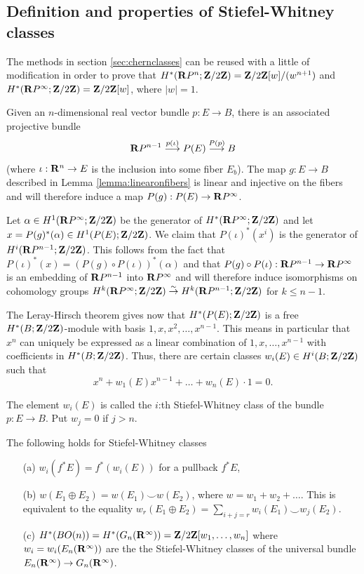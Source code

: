 \documentclass[a4paper,openany]{scrbook}
\begin{document}
\subsection{Definition and properties of Stiefel-Whitney classes}\label{subsec:dfnSWclasses}
The methods  in section \ref{sec:chernclasses} can be reused with a little of modification in order to prove that $H^*(\mathbf R P^n;\mathbf Z/2\mathbf Z)= \mathbf Z/2\mathbf Z[w]/(w^{n+1})$ and $H^*(\mathbf R P^\infty;\mathbf Z/2\mathbf Z)= \mathbf Z/2\mathbf Z[w]$, where $|w|=1$. 

Given an $n$-dimensional real vector bundle $p: E\to B$, there is an associated projective bundle
$$\mathbf R P^{n-1}\overset{p(\iota)}\longrightarrow P(E)\overset{P(p)}\longrightarrow B$$
(where $\iota:\mathbf R^n\to E$ is the inclusion into some fiber $E_b$). The map $g: E\to B$ described in Lemma \ref{lemma:linearonfibers} is linear and injective on the fibers and will therefore induce a map $P(g):P(E)\to\mathbf R P^\infty$.

Let $\alpha\in H^1(\mathbf R P^\infty;\mathbf Z/2\mathbf Z)$ be the generator of $H^*(\mathbf R P^\infty;\mathbf Z/2\mathbf Z)$ and let $x=P(g)^*(\alpha)\in H^1(P(E);\mathbf Z/2\mathbf Z)$.
We claim  that $P(\iota)^*(x^i)$ is the generator of $H^i(\mathbf R P^{n-1};\mathbf Z/2\mathbf Z)$. This follows from the fact that $P(\iota)^*(x)= (P(g)\circ P(\iota))^*(\alpha)$ and that $P(g)\circ P(\iota):\mathbf R P^{n-1}\to \mathbf R P^\infty$ is an embedding of $\mathbf R P^{n-1}$ into $\mathbf R P^\infty$ and will therefore induce isomorphisms on cohomology groups $H^k(\mathbf R P^\infty;\mathbf Z/2\mathbf Z)\overset\sim\to H^k(\mathbf R P^{n-1};\mathbf Z/2\mathbf Z)$ for $k\leq n-1$.

The Leray-Hirsch theorem gives now that $H^*(P(E);\mathbf Z/2\mathbf Z)$ is a free $H^*(B;\mathbf Z/2\mathbf Z)$-module with basis $1,x,x^2,\dots,x^{n-1}$. This means in particular that $x^n$ can uniquely be expressed as a linear combination of $1,x,\dots,x^{n-1}$ with coefficients in $H^*(B;\mathbf Z/2\mathbf Z)$. Thus, there are certain classes $w_i(E)\in H^i(B;\mathbf Z/2\mathbf Z)$ such that
$$x^n+w_1(E)x^{n-1}+\dots+w_n(E)\cdot1=0.$$

\begin{defn}
The element $w_i(E)$ is called the $i$:th Stiefel-Whitney class of the bundle $p:E\to B$. Put $w_j=0$ if $j>n.$
\end{defn}

\begin{prop}
The following holds for Stiefel-Whitney classes
\begin{itemize}
 \item[(a)] $w_i(f^*E)=f^*(w_i(E))$ for a pullback $f^*E$,
 \item[(b)] $w(E_1\oplus E_2)= w(E_1)\smile w(E_2)$, where $w =w_1+w_2+\dots$. This is equivalent to the equality $w_r(E_1\oplus E_2)= \sum\limits_{i+j=r}w_i(E_1)\smile w_j(E_2)$.
 \item[(c)]\label{prop:cohomologyBO} $H^*(BO(n)) = H^*(G_n(\mathbf R^\infty))= \mathbf Z/2\mathbf Z[w_1,\dots,w_n]$ where $w_i=w_i(E_n(\mathbf R^\infty))$ are the the Stiefel-Whitney classes of the universal bundle $E_n(\mathbf R^\infty)\to G_n(\mathbf R^\infty)$.
\end{itemize}
\end{prop}
\end{document}
